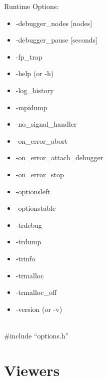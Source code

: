 {\noindent
Runtime Options:
\begin{itemize}
\item -debugger\_nodes [nodes]
\item -debugger\_pause [seconds]
\item -fp\_trap
\item -help (or -h)
\item -log\_history
\item -mpidump
\item -no\_signal\_handler
\item -on\_error\_abort
\item -on\_error\_attach\_debugger
\item -on\_error\_stop
\item -optionsleft
\item -optionstable
\item -trdebug
\item -trdump
\item -trinfo
\item -trmalloc
\item -trmalloc\_off
\item -version (or -v)
\end{itemize}

 \\
{  \#include ``options.h''} \\

{\footnotesize
\noindent

}

\section{Viewers}

}
